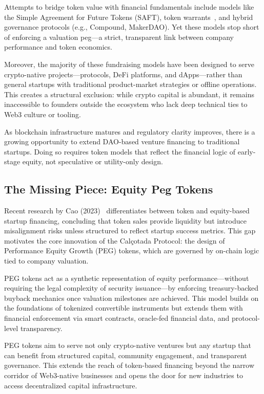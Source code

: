 \documentclass[conference]{IEEEtran}
\begin{document}
Attempts to bridge token value with financial fundamentals include models like the Simple Agreement for Future Tokens (SAFT), token warrants~\cite{lw2019token}, and hybrid governance protocols (e.g., Compound, MakerDAO). Yet these models stop short of enforcing a valuation peg—a strict, transparent link between company performance and token economics.

Moreover, the majority of these fundraising models have been designed to serve crypto-native projects—protocols, DeFi platforms, and dApps—rather than general startups with traditional product-market strategies or offline operations. This creates a structural exclusion: while crypto capital is abundant, it remains inaccessible to founders outside the ecosystem who lack deep technical ties to Web3 culture or tooling.

As blockchain infrastructure matures and regulatory clarity improves, there is a growing opportunity to extend DAO-based venture financing to traditional startups. Doing so requires token models that reflect the financial logic of early-stage equity, not speculative or utility-only design.

\subsection{The Missing Piece: Equity Peg Tokens}

Recent research by Cao (2023)~\cite{cao2023token} differentiates between token and equity-based startup financing, concluding that token sales provide liquidity but introduce misalignment risks unless structured to reflect startup success metrics. This gap motivates the core innovation of the Calçotada Protocol: the design of Performance Equity Growth (PEG) tokens, which are governed by on-chain logic tied to company valuation.

PEG tokens act as a synthetic representation of equity performance—without requiring the legal complexity of security issuance—by enforcing treasury-backed buyback mechanics once valuation milestones are achieved. This model builds on the foundations of tokenized convertible instruments but extends them with financial enforcement via smart contracts, oracle-fed financial data, and protocol-level transparency.

PEG tokens aim to serve not only crypto-native ventures but any startup that can benefit from structured capital, community engagement, and transparent governance. This extends the reach of token-based financing beyond the narrow corridor of Web3-native businesses and opens the door for new industries to access decentralized capital infrastructure.
\end{document}
